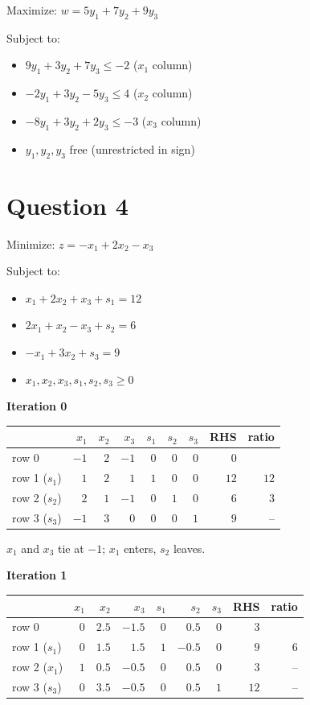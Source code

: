 \documentclass{article}
\begin{document}
Maximize: $w = 5y_1 + 7y_2 + 9y_3$

Subject to:
\begin{itemize}
    \item $9y_1 + 3y_2 + 7y_3 \le -2$ ($x_1$ column)
    \item $-2y_1 + 3y_2 - 5y_3 \le 4$ ($x_2$ column)
    \item $-8y_1 + 3y_2 + 2y_3 \le -3$ ($x_3$ column)
    \item $y_1, y_2, y_3$ free (unrestricted in sign)
\end{itemize}

\section*{Question 4}
Minimize: $z = -x_1 + 2x_2 - x_3$

Subject to:
\begin{itemize}
    \item $x_1 + 2x_2 + x_3 + s_1 = 12$
    \item $2x_1 + x_2 - x_3 + s_2 = 6$
    \item $-x_1 + 3x_2 + s_3 = 9$
    \item $x_1, x_2, x_3, s_1, s_2, s_3 \ge 0$
\end{itemize}

\textbf{Iteration 0}

\begin{center}
\begin{tabular}{lrrrrrrrr}
\toprule
 & $x_1$ & $x_2$ & $x_3$ & $s_1$ & $s_2$ & $s_3$ & RHS & ratio \\
\midrule
row 0 & $-1$ & $2$ & $-1$ & $0$ & $0$ & $0$ & $0$ &  \\
row 1 ($s_1$) & $1$ & $2$ & $1$ & $1$ & $0$ & $0$ & $12$ & $12$ \\
row 2 ($s_2$) & $\boxed{2}$ & $1$ & $-1$ & $0$ & $1$ & $0$ & $6$ & $3$ \\
row 3 ($s_3$) & $-1$ & $3$ & $0$ & $0$ & $0$ & $1$ & $9$ & -- \\
\bottomrule
\end{tabular}
\end{center}

$x_1$ and $x_3$ tie at $-1$; $x_1$ enters, $s_2$ leaves.

\textbf{Iteration 1}

\begin{center}
\begin{tabular}{lrrrrrrrr}
\toprule
 & $x_1$ & $x_2$ & $x_3$ & $s_1$ & $s_2$ & $s_3$ & RHS & ratio \\
\midrule
row 0 & $0$ & $2.5$ & $-1.5$ & $0$ & $0.5$ & $0$ & $3$ &  \\
row 1 ($s_1$) & $0$ & $1.5$ & $\boxed{1.5}$ & $1$ & $-0.5$ & $0$ & $9$ & $6$ \\
row 2 ($x_1$) & $1$ & $0.5$ & $-0.5$ & $0$ & $0.5$ & $0$ & $3$ & -- \\
row 3 ($s_3$) & $0$ & $3.5$ & $-0.5$ & $0$ & $0.5$ & $1$ & $12$ & -- \\
\bottomrule
\end{tabular}
\end{center}
\end{document}
